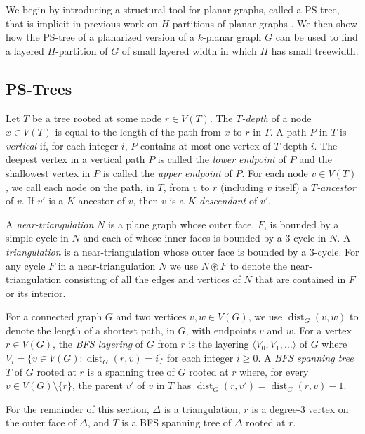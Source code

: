 \documentclass{patmorin}
\DeclareMathOperator{\dist}{dist}
\begin{document}
We begin by introducing a structural tool for planar graphs, called a PS-tree, that is implicit in previous work on $H$-partitions of planar graphs \cite{dujmovic.joret.ea:planar}.  We then show how the PS-tree of a planarized version of a $k$-planar graph $G$ can be used to find a layered $H$-partition of $G$ of small layered width in which $H$ has small treewidth. 

\subsection{PS-Trees}

Let $T$ be a tree rooted at some node $r\in V(T)$. The \emph{$T$-depth} of a node $x\in V(T)$ is equal to the length of the path from $x$ to $r$ in $T$. A path $P$ in $T$ is \emph{vertical} if, for each integer $i$, $P$ contains at most one vertex of $T$-depth $i$.  The deepest vertex in a vertical path $P$ is called  the \emph{lower endpoint} of $P$ and the shallowest vertex in $P$ is called the \emph{upper endpoint} of $P$. For each node $v\in V(T)$, we call each node on the path, in $T$, from $v$ to $r$ (including $v$ itself) a \emph{$T$-ancestor} of $v$.  If $v'$ is a $K$-ancestor of $v$, then $v$ is a \emph{$K$-descendant} of $v'$.

A \emph{near-triangulation} $N$ is a plane graph whose outer face, $F$, is bounded by a simple cycle in $N$ and each of whose inner faces is bounded by a 3-cycle in $N$.  A \emph{triangulation} is a near-triangulation whose outer face is bounded by a 3-cycle.  For any cycle $F$ in a near-triangulation $N$ we use $N\circledast F$ to denote the near-triangulation consisting of all the edges and vertices of $N$ that are contained in $F$ or its interior.

For a connected graph $G$ and two vertices $v,w\in V(G)$, we use $\dist_{G}(v,w)$ to denote the length of a shortest path, in $G$, with endpoints $v$ and $w$.  For a vertex $r\in V(G)$, the \emph{BFS layering} of $G$ from $r$ is the layering $\langle V_0,V_1,\ldots\rangle$ of $G$ where $V_i=\{v\in V(G): \dist_{G}(r,v)=i\}$ for each integer $i\ge 0$.  A \emph{BFS spanning tree} $T$ of $G$ rooted at $r$ is a spanning tree of $G$ rooted at $r$ where, for every $v\in V(G)\setminus\{r\}$, the parent $v'$ of $v$ in $T$ has $\dist_G(r,v')= \dist_G(r,v)-1$.


For the remainder of this section, $\Delta$ is a triangulation, $r$ is a degree-3 vertex on the outer face of $\Delta$, and $T$ is a BFS spanning tree of $\Delta$ rooted at $r$.
\end{document}
